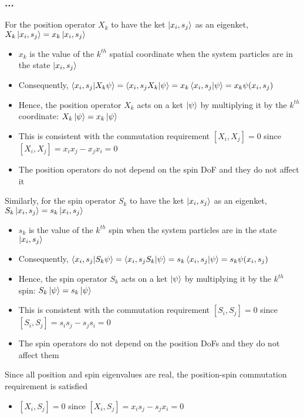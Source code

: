 \documentclass[8pt,t,mathserif,aspectratio=169]{beamer}
\begin{document}
\begin{frame}
  \frametitle{...}
  \vspace{1mm}
  For the position operator $X_k$ to have the ket $\ket{x_i,s_j}$ as an eigenket, $X_k \ket{x_i,s_j} = x_k \ket{x_i,s_j}$
  \begin{itemize}
    \item $x_k$ is the value of the $k^{th}$ spatial coordinate when the system particles are in the state $\ket{x_i,s_j}$
    \item Consequently, $\braket{x_i,s_j}{X_k \psi} = \bra{x_i,s_j X_k} \ket{\psi} = x_k \braket{x_i,s_j}{\psi} = x_k \psi(x_i,s_j)$
    \item Hence, the position operator $X_k$ acts on a ket $\ket{\psi}$ by multiplying it by the $k^{th}$ coordinate: $X_k \ket{\psi} = x_k \ket{\psi}$
    \item This is consistent with the commutation requirement $[X_i,X_j] = 0$ since $[X_i,X_j] = x_i x_j - x_j x_i = 0$
    \item The position operators do not depend on the spin DoF and they do not affect it
  \end{itemize}
  Similarly, for the spin operator $S_k$ to have the ket $\ket{x_i,s_j}$ as an eigenket, $S_k \ket{x_i,s_j} = s_k \ket{x_i,s_j}$
  \begin{itemize}
    \item $s_k$ is the value of the $k^{th}$ spin when the system particles are in the state $\ket{x_i,s_j}$
    \item Consequently, $\braket{x_i,s_j}{S_k \psi} = \bra{x_i,s_j S_k} \ket{\psi} = s_k \braket{x_i,s_j}{\psi} = s_k \psi(x_i,s_j)$
    \item Hence, the spin operator $S_k$ acts on a ket $\ket{\psi}$ by multiplying it by the $k^{th}$ spin: $S_k \ket{\psi} = s_k \ket{\psi}$
    \item This is consistent with the commutation requirement $[S_i,S_j] = 0$ since $[S_i,S_j] = s_i s_j - s_j s_i = 0$
    \item The spin operators do not depend on the position DoFs and they do not affect them
  \end{itemize}
  Since all position and spin eigenvalues are real, the position-spin commutation requirement is satisfied
  \begin{itemize}
    \item $[X_i,S_j] = 0$ since $[X_i,S_j] = x_i s_j - s_j x_i = 0$
  \end{itemize}
\end{frame}
\end{document}
